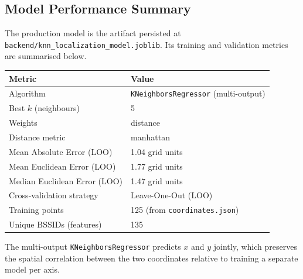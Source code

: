 \documentclass[11pt,a4paper]{article}
\begin{document}
\subsection{Model Performance Summary}
The production model is the artifact persisted at \texttt{backend/knn\_localization\_model.joblib}. Its training and validation metrics are summarised below.
\begin{center}
\renewcommand{\arraystretch}{1.25}
\begin{tabular}{@{}ll@{}}
\toprule
\textbf{Metric} & \textbf{Value} \\ \midrule
Algorithm                          & \texttt{KNeighborsRegressor} (multi-output) \\
Best $k$ (neighbours)              & 5 \\
Weights                            & distance \\
Distance metric                    & manhattan \\
Mean Absolute Error (LOO)          & 1.04 grid units \\
Mean Euclidean Error (LOO)         & 1.77 grid units \\
Median Euclidean Error (LOO)       & 1.47 grid units \\
Cross-validation strategy          & Leave-One-Out (LOO) \\
Training points                    & 125 (from \texttt{coordinates.json}) \\
Unique BSSIDs (features)           & 135 \\
\bottomrule
\end{tabular}
\end{center}
The multi-output \texttt{KNeighborsRegressor} predicts $x$ and $y$ jointly, which preserves the spatial correlation between the two coordinates relative to training a separate model per axis.
\end{document}
